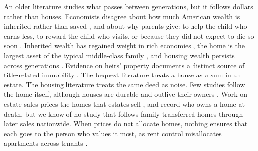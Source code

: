 An older literature studies what passes between generations, but it follows dollars rather than houses. Economists disagree about how much American wealth is inherited rather than saved \citep{kotlikoffsummers1981role,modigliani1988role}, and about why parents give: to help the child who earns less, to reward the child who visits, or because they did not expect to die so soon \citep{beckertomes1979equilibrium,bernheimshleifersummers1985bequest,mcgarry1999intervivos,kopczuklupton2007leave,kopczuk2007bequest}. Inherited wealth has regained weight in rich economies \citep{piketty2011inheritance}, the home is the largest asset of the typical middle-class family \citep{kuhnschularicksteins2020income}, and housing wealth persists across generations \citep{charleshurst2003wealth,binderrischvoorheis2026housing}. Evidence on heirs' property documents a distinct source of title-related immobility \citep{dobbsgaither2023heirs,burnettwm2025heirs}. The bequest literature treats a house as a sum in an estate. The housing literature treats the same deed as noise. Few studies follow the home itself, although houses are durable and outlive their owners \citep{glaesergyourko2005durable}. Work on estate sales prices the homes that estates sell \citep{benefieldrutherfordallen2012estate,andersennielsen2017fire}, and \citet{engelhardteriksen2022homeownership} record who owns a home at death, but we know of no study that follows family-transferred homes through later sales nationwide. When prices do not allocate homes, nothing ensures that each goes to the person who values it most, as rent control misallocates apartments across tenants \citep{glaeserluttmer2003rentcontrol}.

